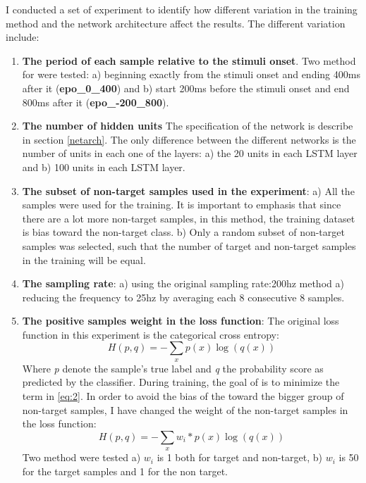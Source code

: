 \documentclass[]{report}
\begin{document}
I conducted a set of experiment to identify how different variation in the training method and the network architecture affect the results. The different variation include:

\begin{enumerate}
	\item \textbf{The period of each sample relative to the stimuli onset}. Two method for were tested: a) beginning exactly from the stimuli onset and ending 400ms after it (\textbf{epo\_0\_400}) and b) start 200ms before the stimuli onset and end 800ms after it (\textbf{epo\_-200\_800}). %
	
	\item \textbf{The number of hidden units} The specification of the  network is describe in section \ref{netarch}. The only difference between the different networks is the number of units in each one of the layers: a) the 20 units in each LSTM layer and b) 100 units in each LSTM layer. %
	

	
	\item \textbf{The subset of non-target samples used in the experiment}:	a) All the samples were used for the training. It is important to emphasis that since there are a lot more non-target samples, in this method, the training dataset is bias toward the non-target class. b) Only a random subset of non-target samples was selected, such that the number of target and non-target samples in the training will be equal.
	\item \textbf{The sampling rate}: a) using the original sampling rate:200hz method a) reducing the frequency to 25hz by averaging each 8 consecutive 8 samples.
	\item \textbf{The positive samples weight in the loss function}: 
	The original loss function in this experiment is the categorical cross entropy:
	\begin{equation}\label{eq:2}
	H(p,q) = - \sum_x p(x) \log(q(x))
	\end{equation}
	Where \textit{p} denote the sample's true label and \textit{q} the probability score as predicted by the classifier. During training, the goal of is to minimize the term in \eqref{eq:2}. In order to avoid the bias of the toward the bigger group of non-target samples, I have changed the weight of the non-target samples in the loss function:
	\begin{equation}\label{eq:3}
	H(p,q) = - \sum_x w_i*p(x) \log(q(x)) 
	\end{equation}
	Two method were tested a) $w_i$ is 1 both for target and non-target, b) $w_i$ is 50 for the target samples and 1 for the non target.
	
	
\end{enumerate}
\end{document}
